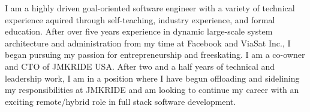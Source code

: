 

\begin{cvparagraph}

I am a highly driven goal-oriented software engineer with a variety of technical
experience aquired through self-teaching, industry experience, and formal education.
After over five years experience in dynamic large-scale system architecture and
administration from my time at Facebook and ViaSat Inc., I began pursuing my
passion for entrepreneurship and freeskating. I am a co-owner and CTO of JMKRIDE
USA. After two and a half years of technical and leadership work, I am in a
position where I have begun offloading and sidelining my responsibilities at
JMKRIDE and am looking to continue my career with an exciting remote/hybrid role
in full stack software development.
\end{cvparagraph}
